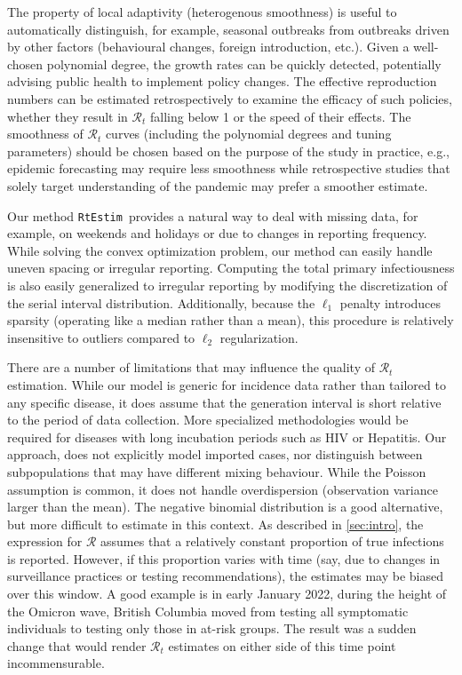 \documentclass[10pt,letterpaper]{article}
\def\RtEstim{\texttt{RtEstim}}
\def\calR{\mathcal{R}}
\begin{document}
The property of local adaptivity (heterogenous smoothness) is useful to
automatically distinguish, for example, seasonal outbreaks from outbreaks driven
by other factors (behavioural changes, foreign introduction, etc.). Given a
well-chosen polynomial degree, the growth rates can be quickly detected, 
potentially advising public health to implement policy changes. The effective
reproduction numbers can be estimated retrospectively to examine the efficacy of
such policies, whether they result in $\calR_t$ falling below 1 or the speed of
their effects. The smoothness of $\calR_t$ curves (including the polynomial 
degrees and tuning parameters) should be chosen based on the purpose of the 
study in practice, e.g., epidemic forecasting may require less smoothness
while retrospective studies that 
solely target understanding of the pandemic may prefer a smoother estimate. 


Our method \RtEstim\ provides a natural way to deal with missing data, for
example, on weekends and holidays or due to changes in reporting frequency.
While solving the convex optimization problem, our method can easily 
handle uneven spacing or irregular reporting. Computing the total
primary infectiousness is also easily generalized to irregular reporting by
modifying the discretization of the serial interval distribution. Additionally,
because the $\ell_1$ penalty introduces sparsity (operating like a median
rather than a mean), this procedure is relatively insensitive to outliers
compared to $\ell_2$ regularization.


There are a number of limitations that may influence the quality of
$\calR_t$ estimation. While our model is generic for incidence data 
rather than tailored to any specific disease, it does assume that the 
generation interval is short relative to the period of data collection. 
More specialized methodologies would be required for diseases with long 
incubation periods such as HIV or Hepatitis. 
Our approach, does not explicitly model imported cases, nor distinguish between
subpopulations that may have different mixing behaviour. 
While the Poisson assumption is common, it does not handle overdispersion
(observation variance larger than the mean). The negative binomial distribution
is a good alternative, but more difficult to estimate in this context.
As described in \autoref{sec:intro}, the expression for $\calR$ 
assumes that a relatively constant proportion of true infections is reported. 
However, if this proportion varies with time (say, due to changes in surveillance
practices or testing recommendations), the estimates may be biased over this
window. A good example is in early January 2022, during the height of the
Omicron wave, British Columbia moved from testing all symptomatic individuals to
testing only those in at-risk groups. The result was a sudden change that would
render $\calR_t$ estimates on either side of this time point incommensurable.
\end{document}
